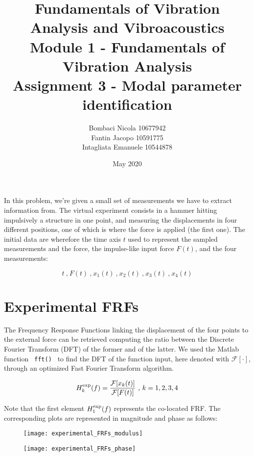 \documentclass[a4paper,12pt,oneside]{article}
\title{Fundamentals of Vibration Analysis and Vibroacoustics \\
Module 1 - Fundamentals of Vibration Analysis \\
Assignment 3 - Modal parameter identification}
\author{Bombaci Nicola 10677942 \\
Fantin Jacopo 10591775 \\
Intagliata Emanuele 10544878}
\date{May 2020}
\begin{document}
\maketitle

\vspace{100pt}

In this problem, we're given a small set of measurements we have to extract information from. The virtual experiment consists in a hammer hitting impulsively a structure in one point, and measuring the displacements in four different positions, one of which is where the force is applied (the first one). The initial data are wherefore the time axis $ t $ used to represent the sampled measurements and the force, the impulse-like input force $ F(t) $, and the four measurements:

\[
	t ~ \text{,} ~ F(t) ~ \text{,} ~ %
		x_1(t) ~ \text{,} ~ x_2(t) ~ \text{,} ~ x_3(t) ~ \text{,} ~ x_4(t)
\]

\section{Experimental FRFs}
\label{sec:experimental_frfs}

The Frequency Response Functions linking the displacement of the four points to the external force can be retrieved computing the ratio between the Discrete Fourier Transform (DFT) of the former and of the latter. We used the Matlab function \lstinline! fft() ! to find the DFT of the function input, here denoted with $ \mathcal{F[\cdot]} $, through an optimized Fast Fourier Transform algorithm.


\[
	H^\textup{exp}_k(f) = \frac{\mathcal{F}[x_k(t)]}{\mathcal{F}[F(t)]} ~ \text{,} ~ %
		k = 1,2,3,4
\]

Note that the first element $ H^\textup{exp}_1(f) $ represents the co-located FRF. The corresponding plots are represented in magnitude and phase as follows:

\begin{figure}[H]
	\centering
	\texttt{[image: experimental\_FRFs\_modulus]}
\end{figure}

\begin{figure}[H]
	\centering
	\texttt{[image: experimental\_FRFs\_phase]}
\end{figure}
\end{document}
